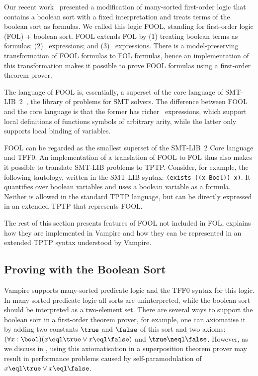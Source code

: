Our recent work~\cite{FOOL} presented a modification of many-sorted first-order logic that contains a boolean sort with a fixed interpretation and treats terms of the boolean sort as formulas. We called this logic FOOL, standing for first-order logic (FOL) + boolean sort. FOOL extends FOL by (1) treating boolean terms as formulas; (2) \ITE\ expressions; and (3) \LETIN\ expressions. There is a model-preserving transformation of FOOL formulas to FOL formulas, hence an implementation of this transformation makes it possible to prove FOOL formulas using a first-order theorem prover.

The language of FOOL is, essentially, a superset of the core language of SMT-LIB~2~\cite{SMT-LIB}, the library of problems for SMT solvers. The difference between FOOL and the core language is that the former has richer \LETIN\ expressions, which support local definitions of functions symbols of arbitrary arity, while the latter only supports local binding of variables.

FOOL can be regarded as the smallest superset of the SMT-LIB~2 Core language and TFF0. An implementation of a translation of FOOL to FOL thus also makes it possible to translate SMT-LIB problems to TPTP. Consider, for example, the following tautology, written in the SMT-LIB syntax: \verb'(exists ((x Bool)) x)'. It quantifies over boolean variables and uses a boolean variable as a formula. Neither is allowed in the standard TPTP language, but can be directly expressed in an extended TPTP that represents FOOL.

The rest of this section presents features of FOOL not included in FOL, explains how they are implemented in Vampire and how they can be represented in an extended TPTP syntax understood by Vampire.

\subsection{Proving with the Boolean Sort}

Vampire supports many-sorted predicate logic and the TFF0 syntax for this logic. In many-sorted predicate logic all sorts are uninterpreted, while the boolean sort should be interpreted as a two-element set. There are several ways to support the boolean sort in a first-order theorem prover, for example, one can axiomatise it by adding two constants $\true$ and $\false$ of this sort and two axioms: $(\forall x:\bool)(x \eql \true \lor x \eql \false)$ and $\true \neql \false$. However, as we discuss in \cite{FOOL}, using this axiomatisation in a superposition theorem prover may result in performance problems caused by self-paramodulation of $x \eql \true \lor x \eql \false$.

